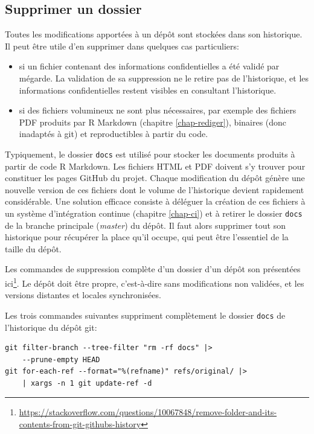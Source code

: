 \documentclass[
  12pt,
  french,
  a4paper,
  extrafontsizes,onecolumn,openright
  ]{memoir}
\providecommand{\tightlist}{%
  \setlength{\itemsep}{0pt}\setlength{\parskip}{0pt}}
\newlength{\rf}
\begin{document}
\subsection{Supprimer un dossier}\label{supprimer-un-dossier}

Toutes les modifications apportées à un dépôt sont stockées dans son historique.
Il peut être utile d'en supprimer dans quelques cas particuliers:

\begin{itemize}
\tightlist
\item
  si un fichier contenant des informations confidentielles a été validé par mégarde.
  La validation de sa suppression ne le retire pas de l'historique, et les informations confidentielles restent visibles en consultant l'historique.
\item
  si des fichiers volumineux ne sont plus nécessaires, par exemple des fichiers PDF produits par R Markdown (chapitre \ref{chap-rediger}), binaires (donc inadaptés à git) et reproductibles à partir du code.
\end{itemize}

Typiquement, le dossier \texttt{docs} est utilisé pour stocker les documents produits à partir de code R Markdown.
Les fichiers HTML et PDF doivent s'y trouver pour constituer les pages GitHub du projet.
Chaque modification du dépôt génère une nouvelle version de ces fichiers dont le volume de l'historique devient rapidement considérable.
Une solution efficace consiste à déléguer la création de ces fichiers à un système d'intégration continue (chapitre \ref{chap-ci}) et à retirer le dossier \texttt{docs} de la branche principale (\emph{master}) du dépôt.
Il faut alors supprimer tout son historique pour récupérer la place qu'il occupe, qui peut être l'essentiel de la taille du dépôt.

Les commandes de suppression complète d'un dossier d'un dépôt son présentées ici\footnote{\url{https://stackoverflow.com/questions/10067848/remove-folder-and-its-contents-from-git-githubs-history}}.
Le dépôt doit être propre, c'est-à-dire sans modifications non validées, et les versions distantes et locales synchronisées.

Les trois commandes suivantes suppriment complètement le dossier \texttt{docs} de l'historique du dépôt git:

\begin{verbatim}
git filter-branch --tree-filter "rm -rf docs" |>
    --prune-empty HEAD
git for-each-ref --format="%(refname)" refs/original/ |>
    | xargs -n 1 git update-ref -d
\end{verbatim}
\end{document}
